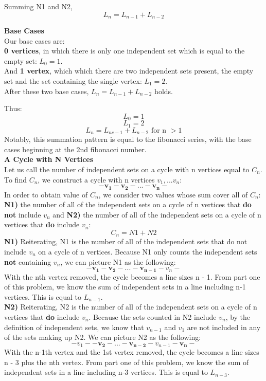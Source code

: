 \documentclass[11pt, solution, letterpaper]{format}
\begin{document}
Summing N1 and N2, 
$$L_n = L_{n - 1} + L_{n - 2}$$

\textbf{Base Cases}\\
Our base cases are: \\
\textbf{0 vertices}, in which there is only one independent set which is equal to the empty set: $L_0 = 1$.\\
And \textbf{1 vertex}, which which there are two independent sets present, the empty set and the set containing the single vertex: $L_1 = 2$.\\


After these two base cases,
$L_n = L_{n - 1} + L_{n - 2}$ holds.

Thus:
$$L_0 = 1$$$$L_1 = 2$$$$L_n = L_{nc - 1} + L_{n - 2} \text{ for n }> 1$$
Notably, this summation pattern is equal to the fibonacci series, with the base cases beginning at the 2nd fibonacci number.\\

\textbf{A Cycle with N Vertices}\\
Let us call the number of independent sets on a cycle with n vertices equal to $C_n$. To find $C_n$, we construct a cycle with n vertices {$v_1, ... v_n$}: $$\pmb{-v_1-v_2-  ...  -v_n-}$$
In order to obtain value of $C_n$, we consider two values whose sum cover all of $C_n$: \textbf{N1)} the number of all of the independent sets on a cycle of n vertices that \textbf{do not} include $v_n$ and \textbf{N2)} the number of all of the independent sets on a cycle of n vertices that \textbf{do} include $v_n$: $$C_n = N1 + N2$$
\textbf{N1)} Reiterating, N1 is the number of all of the independent sets that do not include $v_n$ on a cycle of n vertices. Because N1 only counts the independent sets \textbf{not} containing $v_n$, we can picture N1 as the following:
$$\pmb{-v_1-v_2-  ...  -v_{n-1}}-v_n-$$
With the nth vertex removed, the cycle becomes a line sizes n - 1. From part one of this problem, we know the sum of independent sets in a line including n-1 vertices. This is equal to $L_{n-1}$. \\

\textbf{N2)} Reiterating, N2 is the number of all of the independent sets on a cycle of n vertices that \textbf{do} include $v_n$. Because the sets counted in N2 include $v_n$, by the definition of independent sets, we know that $v_{n-1}$ and $v_1$ are not included in any of the sets making up N2. We can picture N2 as the following:
$$- v_1 - \pmb{-v_2-  ...  -v_{n-2}}-v_{n-1}-\pmb{v_n}-$$
With the n-1th vertex and the 1st vertex removed, the cycle becomes a line sizes n - 3 plus the nth vertex. From part one of this problem, we know the sum of independent sets in a line including n-3 vertices. This is equal to $L_{n-3}$. \\
\end{document}
